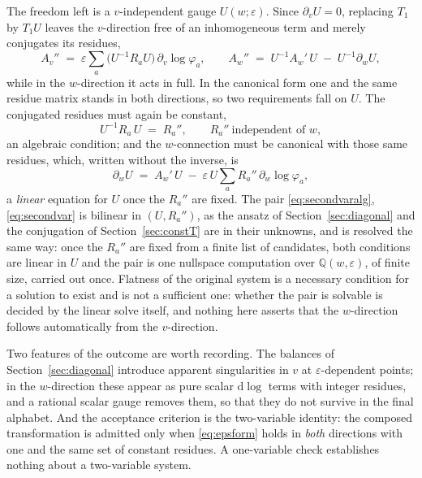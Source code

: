 \documentclass[11pt]{article}
\newcommand{\eps}{\varepsilon}
\newcommand{\dd}{\mathrm{d}}
\newcommand{\Q}{\mathbb{Q}}
\begin{document}
The freedom left is a $v$-independent gauge $U(w;\eps)$.  Since
$\partial_v U = 0$, replacing $T_1$ by $T_1 U$ leaves the
$v$-direction free of an inhomogeneous term and merely conjugates its
residues,
\begin{equation}
  A_v'' \;=\; \eps \sum_a \big(U^{-1}R_a U\big)\,
  \partial_v\log\varphi_a ,
  \qquad
  A_w'' \;=\; U^{-1}A_w'\,U \;-\; U^{-1}\partial_w U ,
\end{equation}
while in the $w$-direction it acts in full.  In the canonical form
one and the same residue matrix stands in both directions, so two
requirements fall on $U$.  The conjugated residues must again be
constant,
\begin{equation}
  U^{-1} R_a\, U \;=\; R_a'' , \qquad
  R_a'' \ \text{independent of } w ,
  \label{eq:secondvaralg}
\end{equation}
an algebraic condition; and the $w$-connection must be canonical with
those same residues, which, written without the inverse, is
\begin{equation}
  \partial_w U
  \;=\; A_w'\,U \;-\; \eps\, U \sum_a R_a''\,
        \partial_w\log\varphi_a ,
  \label{eq:secondvar}
\end{equation}
a \emph{linear} equation for $U$ once the $R_a''$ are fixed.  The pair
\eqref{eq:secondvaralg}, \eqref{eq:secondvar} is bilinear in
$(U, R_a'')$, as the ansatz of Section~\ref{sec:diagonal} and the
conjugation of Section~\ref{sec:constT} are in their unknowns, and is
resolved the same way: once the $R_a''$ are fixed from a finite list
of candidates, both conditions are linear in $U$ and the pair is one
nullspace computation over $\Q(w,\eps)$, of finite size, carried out
once.  Flatness of the original system is a necessary condition for a
solution to exist and is not a sufficient one:
whether the pair is solvable is decided by the linear solve itself,
and nothing here asserts that the $w$-direction follows
automatically from the $v$-direction.

Two features of the outcome are worth recording.  The balances of
Section~\ref{sec:diagonal} introduce apparent singularities in $v$ at
$\eps$-dependent points; in the $w$-direction these appear as pure
scalar $\dd\log$ terms with integer residues, and a rational scalar
gauge removes them, so that they do not survive in the final
alphabet.  And the acceptance criterion is the two-variable identity:
the composed transformation is admitted only when
\eqref{eq:epsform} holds in \emph{both} directions with one and the
same set of constant residues.  A one-variable check establishes
nothing about a two-variable system.
\end{document}
